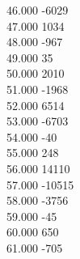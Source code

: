 { 46.000	-6029 \\
 47.000	1034 \\
 48.000	-967 \\
 49.000	35 \\
 50.000	2010 \\
 51.000	-1968 \\
 52.000	6514 \\
 53.000	-6703 \\
 54.000	-40 \\
 55.000	248 \\
 56.000	14110 \\
 57.000	-10515 \\
 58.000	-3756 \\
 59.000	-45 \\
 60.000	650 \\
 61.000	-705 \\
}

